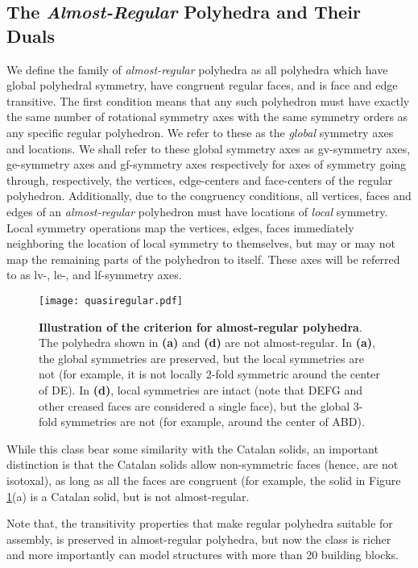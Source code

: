 \documentclass[11pt]{article}
\newcommand{\1}{\mathds{1}}
\begin{document}
\subsection{The \emph{Almost-Regular} Polyhedra and Their Duals}
We define the family of \emph{almost-regular} polyhedra as all polyhedra which have global polyhedral symmetry, have congruent regular faces, and is face and edge transitive. The first condition means that any such polyhedron must have exactly the same number of rotational symmetry axes with the same symmetry orders as any specific regular polyhedron. We refer to these as the \emph{global} symmetry axes and locations. We shall refer to these global symmetry axes as gv-symmetry axes, ge-symmetry axes and gf-symmetry axes respectively for axes of symmetry going through, respectively, the vertices, edge-centers and face-centers of the regular polyhedron. Additionally, due to the congruency conditions, all vertices, faces and edges of an \emph{almost-regular} polyhedron must have locations of \emph{local} symmetry. Local symmetry operations map the vertices, edges, faces immediately neighboring the location of local symmetry to themselves, but may or may not map the remaining parts of the polyhedron to itself. These axes will be referred to as lv-, le-, and lf-symmetry axes.

\begin{figure}[h!]
\centering
\texttt{[image: quasiregular.pdf]}
\caption[Illustration of the criterion for almost-regular polyhedra]{ \textbf{Illustration of the criterion for almost-regular polyhedra}. The polyhedra shown in \textbf{(a)} and \textbf{(d)} are not almost-regular. In \textbf{(a)}, the global symmetries are preserved, but the local symmetries are not (for example, it is not locally 2-fold symmetric around the center of DE). In \textbf{(d)}, local symmetries are intact (note that DEFG and other creased faces are considered a single face), but the global 3-fold symmetries are not (for example, around the center of ABD).}
\label{fig:assemblytheory:quasi}
\end{figure}

While this class bear some similarity with the Catalan solids, an important distinction is that the Catalan solids allow non-symmetric faces (hence, are not isotoxal), as long as all the faces are congruent (for example, the solid in Figure \ref{fig:assemblytheory:quasi}(a) is a Catalan solid, but is not almost-regular.

Note that, the transitivity properties that make regular polyhedra suitable for assembly, is preserved in almost-regular polyhedra, but now the class is richer and more importantly can model structures with more than 20 building blocks.
\end{document}
